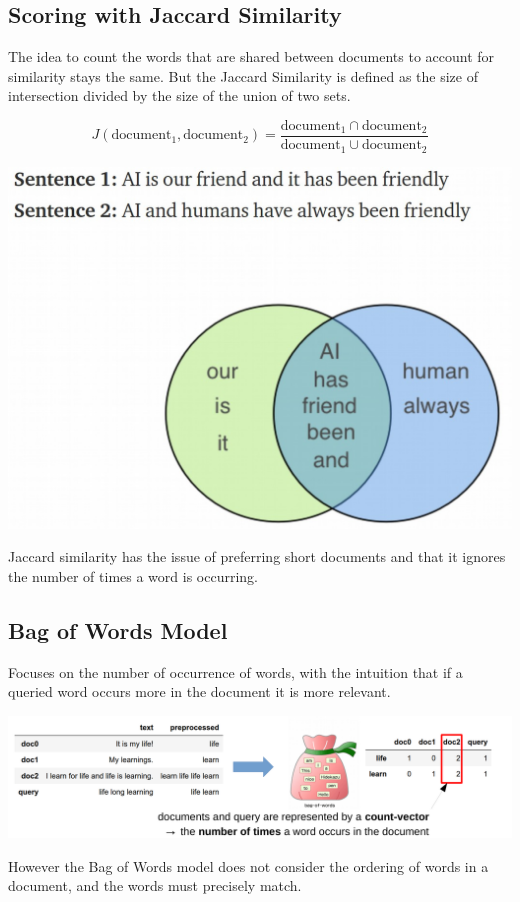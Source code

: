 \documentclass[11pt]{article}
\begin{document}
\subsection{Scoring with Jaccard Similarity}
The idea to count the words that are shared between documents to account for similarity stays the same. But the Jaccard Similarity is defined as the size of intersection divided by the size of the union of two sets.

\noindent
\begin{minipage}{0.55\linewidth}
	\begin{equation*}
	J(\text{document}_1,\text{document}_2) = \frac{\text{document}_1\cap\text{document}_2}{\text{document}_1\cup\text{document}_2}
	\end{equation*}
\end{minipage}
\hfill
\begin{minipage}{0.4\linewidth}
	\begin{center}
		\includegraphics[width=\linewidth]{img/jaccard_set}
	\end{center}
\end{minipage}
Jaccard similarity has the issue of preferring short documents and that it ignores the number of times a word is occurring.

\subsection{Bag of Words Model}
Focuses on the number of occurrence of words, with the intuition that if a queried word occurs more in the document it is more relevant.
\begin{center}
	\includegraphics[width=0.8\linewidth]{img/bagofwords_model}
\end{center}
However the Bag of Words model does not consider the ordering of words in a document, and the words must precisely match.
\end{document}
